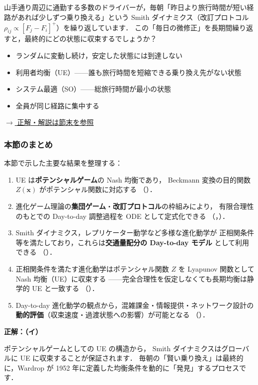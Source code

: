 \begin{example}[title={クイズ 9：毎朝の「昨日より速い道」探しは，どこへ収束する？}]
山手通り周辺に通勤する多数のドライバーが，毎朝「昨日より旅行時間が短い経路があれば少しずつ乗り換える」という
Smith ダイナミクス（改訂プロトコル $\rho_{ij}\propto[F_j-F_i]^+$）を繰り返しています．
この「毎日の微修正」を長期間繰り返すと，最終的にどの状態に収束するでしょうか？
\begin{itemize}
  \item[(ア)] ランダムに変動し続け，安定した状態には到達しない
  \item[(イ)] 利用者均衡（UE）——誰も旅行時間を短縮できる乗り換え先がない状態
  \item[(ウ)] システム最適（SO）——総旅行時間が最小の状態
  \item[(エ)] 全員が同じ経路に集中する
\end{itemize}
\hyperref[ans:q9]{$\rightarrow$ 正解・解説は節末を参照}
\end{example}

\subsubsection*{本節のまとめ}

本節で示した主要な結果を整理する：
\begin{enumerate}
  \item UE は\textbf{ポテンシャルゲーム}の Nash 均衡であり，
        Beckmann 変換の目的関数 $Z(\boldsymbol{x})$ がポテンシャル関数に対応する
        （）．
  \item 進化ゲーム理論の\textbf{集団ゲーム}・\textbf{改訂プロトコル}の枠組みにより，
        有限合理性のもとでの Day-to-day 調整過程を ODE として定式化できる
        （，）．
  \item Smith ダイナミクス，レプリケーター動学など多様な進化動学が
        正相関条件等を満たしており，これらは\textbf{交通量配分の Day-to-day モデル}
        として利用できる
        （）．
  \item 正相関条件を満たす進化動学はポテンシャル関数 $Z$ を Lyapunov 関数として
        Nash 均衡（UE）に収束する
        ——完全合理性を仮定しなくても長期均衡は静学的 UE と一致する
        （）．
  \item Day-to-day 進化動学の観点から，混雑課金・情報提供・ネットワーク設計の
        \textbf{動的評価}（収束速度・過渡状態への影響）が可能となる
        （）．
\end{enumerate}

\begin{example}[title={クイズ 9 正解・解説}]
\label{ans:q9}
\textbf{正解：（イ）}

ポテンシャルゲームとしての UE の構造から，
Smith ダイナミクスはグローバルに UE に収束することが保証されます．
毎朝の「賢い乗り換え」は最終的に，Wardrop が 1952 年に定義した均衡条件を動的に「発見」するプロセスです．
\end{example}
